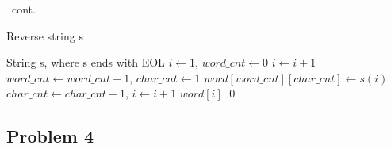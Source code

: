 \documentclass{beamer}
\begin{document}
        \begin{frame}[c,shrink]{\subsecname\ cont.}          
            \begin{algorithm}[H]
                \caption {Reverse string s}
                \label{alg1}
                \begin{algorithmic}[1]
                    \REQUIRE String s, where s ends with EOL
                    \STATE $i \leftarrow 1$, $word\_cnt \leftarrow 0$ 
                    \STATE $i \leftarrow i+1$
                    \ENDWHILE
                    \STATE $word\_cnt \leftarrow word\_cnt+1$, $char\_cnt \leftarrow 1$
                    \STATE $word[word\_cnt][char\_cnt] \leftarrow s(i)$
                    \STATE $char\_cnt \leftarrow char\_cnt + 1$, $i \leftarrow i+1$
                    \ENDWHILE
                    \ENDIF
                    \ENDWHILE
                    \PRINT $word[i]$
                    \ENDFOR \qed
                \end{algorithmic}
            \end{algorithm}        
        \end{frame}
        
        
        
    \subsection{Problem 4}
    
\end{document}
